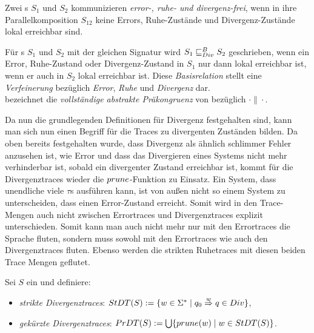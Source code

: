 \begin{Def}
  Zwei \EIO{}s $S_1$ und $S_2$ kommunizieren \emph{error-, ruhe- und
  divergenz-frei}, wenn in ihre Parallelkomposition $S_{12}$ keine Errors,
  Ruhe-Zustände und Divergenz-Zustände lokal erreichbar sind.
\end{Def}

\begin{Def}
\label{DefDivBasisrel}
Für \EIO{}s $S_1$ und $S_2$ mit der gleichen Signatur wird $S_1\sqsubseteq _{Div}^B S_2$
geschrieben, wenn ein Error, Ruhe-Zustand oder Divergenz-Zustand in $S_1$ nur
dann lokal erreichbar ist, wenn er auch in $S_2$ lokal erreichbar ist. Diese
\emph{Basisrelation} stellt eine \emph{Verfeinerung} bezüglich \emph{Error},
\emph{Ruhe} und \emph{Divergenz} dar.\\
\DCRel{} bezeichnet die \emph{vollständige abstrakte Präkongruenz} von \DBRel{}
bezüglich $\cdot\|\cdot$.
\end{Def}

Da nun die grundlegenden Definitionen für Divergenz festgehalten sind,
kann man sich nun einen Begriff für die Traces zu divergenten Zuständen
bilden. Da oben bereits festgehalten wurde, dass Divergenz als ähnlich
\glqq{}schlimmer\grqq{} Fehler anzusehen ist, wie Error und dass das Divergieren
eines Systems nicht mehr verhinderbar ist, sobald ein divergenter Zustand
erreichbar ist, kommt für die Divergenztraces wieder die $prune$-Funktion zu
Einsatz. Ein System, dass unendliche viele $\tau$s ausführen kann, ist von
außen nicht so einem System zu unterscheiden, dass einen Error-Zustand
erreicht. Somit wird in den Trace-Mengen auch nicht zwischen Errortraces und
Divergenztraces explizit unterschieden. Somit kann man auch nicht mehr nur mit
den Errortraces die Sprache fluten, sondern muss sowohl mit den Errortraces wie
auch den Divergenztraces fluten. Ebenso werden die strikten Ruhetraces mit
diesen beiden Trace Mengen geflutet.

\begin{Def}[Divergenztraces]
  Sei $S$ ein \EIO{} und definiere:
  \begin{itemize}
    \item \emph{strikte Divergenztraces}: $StDT{}(S) := \{w\in\Sigma ^*\mid
      q_0 \overset{w}{\Rightarrow} q\in Div\}$,
    \item \emph{gekürzte Divergenztraces}: $PrDT{}(S) :=
      \bigcup\{prune{}(w)\mid w\in StDT{}(S)\}$.
  \end{itemize}
\end{Def}

